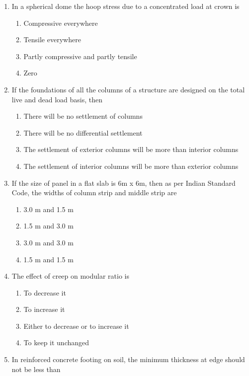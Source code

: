 \documentclass[11pt,a4paper]{article}
\begin{document}
\begin{enumerate}
\item{In a spherical dome the hoop stress due to a concentrated load at crown is}
\begin{enumerate}[label=\Alph*.]
\item{Compressive everywhere}
\item{Tensile everywhere}
\item{Partly compressive and partly tensile}
\item{Zero}
\end{enumerate}
\item{If the foundations of all the columns of a structure are designed on the total live and dead load basis, then}
\begin{enumerate}[label=\Alph*.]
\item{There will be no settlement of columns}
\item{There will be no differential settlement}
\item{The settlement of exterior columns will be more than interior columns}
\item{The settlement of interior columns will be more than exterior columns}
\end{enumerate}
\item{If the size of panel in a flat slab is 6m x 6m, then as per Indian Standard Code, the widths of column strip and middle strip are}
\begin{enumerate}[label=\Alph*.]
\item{3.0 m and 1.5 m}
\item{1.5 m and 3.0 m}
\item{3.0 m and 3.0 m}
\item{1.5 m and 1.5 m}
\end{enumerate}
\item{The effect of creep on modular ratio is}
\begin{enumerate}[label=\Alph*.]
\item{To decrease it}
\item{To increase it}
\item{Either to decrease or to increase it}
\item{To keep it unchanged}
\end{enumerate}
\item{In reinforced concrete footing on soil, the minimum thickness at edge should not be less than}

\end{enumerate}
\end{document}
